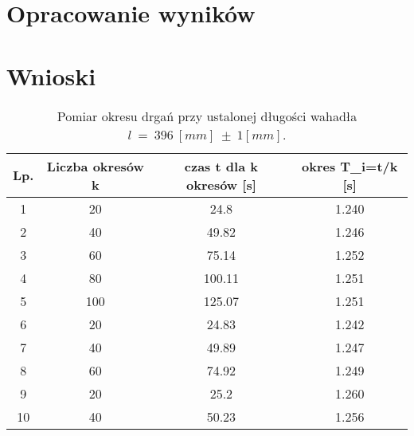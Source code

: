 \documentclass[a4paper,12pts]{article}
\begin{document}
	\section{Opracowanie wyników}
	
	\section{Wnioski}
	
	
	\begin{table}[hb!]
		\centering
		\begin{tabular}{ | c | c | c | c | }
			\hline
			\textrm{Lp.} & \textrm{Liczba okresów } k & \textrm{czas } t \textrm{ dla } k \textrm{ okresów } [s] & \textrm{okres } T_i=t/k [s] \\ \hline
			1 & 20 & 24.8 & 1.240 \\ \hline
			2 & 40 & 49.82 & 1.246 \\ \hline
			3 & 60 & 75.14 & 1.252 \\ \hline
			4 & 80 & 100.11 & 1.251 \\ \hline
			5 & 100 & 125.07 & 1.251 \\ \hline
			6 & 20 & 24.83 & 1.242 \\ \hline
			7 & 40 & 49.89 & 1.247 \\ \hline
			8 & 60 & 74.92 & 1.249 \\ \hline
			9 & 20 & 25.2 & 1.260 \\ \hline
			10 & 40 & 50.23 & 1.256 \\ \hline
		\end{tabular}
		\caption{Pomiar okresu drgań przy ustalonej długości wahadła $l~=~396~[mm]~\pm~1 [mm]$.}
		\label{Tabela1}	
	\end{table}
	
\end{document}
